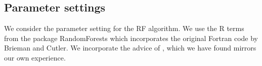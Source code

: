 \documentclass[10pt,a4paper]{article}  %
\begin{document}









\subsection{Parameter settings}
We consider the parameter setting for the RF algorithm. We use the R terms from the package RandomForests
\cite{Liaw.and.Weiner.2002} which incorporates the original Fortran code by Brieman and Cutler. We incorporate the 
advice of \cite{Liaw.and.Weiner.2002}, which we have found mirrors our own experience.
\end{document}
